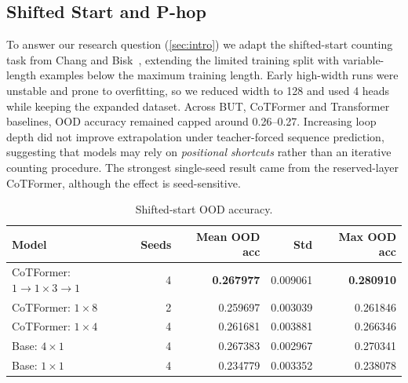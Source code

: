 \documentclass[10pt, letterpaper]{article} %
\begin{document}


\subsection{Shifted Start and P-hop}
To answer our research question (\cref{sec:intro}) we adapt the shifted-start counting task from Chang and Bisk~\cite{chang2025counting}, extending the limited training split with variable-length examples below the maximum training length. Early high-width runs were unstable and prone to overfitting, so we reduced width to 128 and used 4 heads while keeping the expanded dataset. Across BUT, CoTFormer and Transformer baselines, OOD accuracy remained capped around 0.26--0.27. Increasing loop depth did not improve extrapolation under teacher-forced sequence prediction, suggesting that models may rely on \emph{positional shortcuts} rather than an iterative counting procedure. The strongest single-seed result came from the reserved-layer CoTFormer, although the effect is seed-sensitive.

\begin{table}[H]
\centering
\label{tab:ood_acc_summary}
{\small
\renewcommand{\arraystretch}{0.78}
\setlength{\tabcolsep}{4pt}
\setlength{\aboverulesep}{0.25ex}
\setlength{\belowrulesep}{0.25ex}
\setlength{\heavyrulewidth}{0.08em}
\setlength{\lightrulewidth}{0.04em}
\begin{tabular}{lrrrr}

\toprule
Model & Seeds & Mean OOD acc & Std & Max OOD acc \\
\midrule
CoTFormer: \(1 \to 1{\times}3 \to 1\) & 4 & \textbf{0.267977} & 0.009061 & \textbf{0.280910} \\
CoTFormer: \(1{\times}8\)             & 2 & 0.259697 & 0.003039 & 0.261846 \\
CoTFormer: \(1{\times}4\)             & 4 & 0.261681 & 0.003881 & 0.266346 \\
Base: \(4{\times}1\)                  & 4 & 0.267383 & 0.002967 & 0.270341 \\
Base: \(1{\times}1\)                  & 4 & 0.234779 & 0.003352 & 0.238078 \\
\bottomrule
\end{tabular}
}
\caption{Shifted-start OOD accuracy.}
\end{table}
\end{document}
